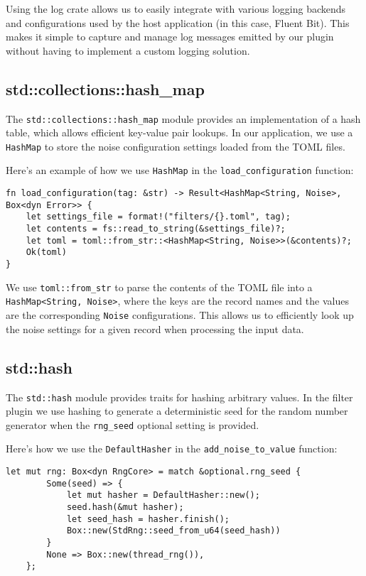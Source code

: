 Using the log crate allows us to easily integrate with various logging backends and configurations used by the host application (in this case, Fluent Bit). This makes it simple to capture and manage log messages emitted by our plugin without having to implement a custom logging solution.

\subsection{std::collections::hash\_map}
The \texttt{std::collections::hash_map} module provides an implementation of a hash table, which allows efficient key-value pair lookups. In our application, we use a \texttt{HashMap} to store the noise configuration settings loaded from the TOML files.

Here's an example of how we use \texttt{HashMap} in the \texttt{load_configuration} function:

\begin{verbatim}
fn load_configuration(tag: &str) -> Result<HashMap<String, Noise>, Box<dyn Error>> {
    let settings_file = format!("filters/{}.toml", tag);
    let contents = fs::read_to_string(&settings_file)?;
    let toml = toml::from_str::<HashMap<String, Noise>>(&contents)?;
    Ok(toml)
}
\end{verbatim}

We use \texttt{toml::from_str} to parse the contents of the TOML file into a \texttt{HashMap<String, Noise>}, where the keys are the record names and the values are the corresponding \texttt{Noise} configurations. This allows us to efficiently look up the noise settings for a given record when processing the input data.

\subsection{std::hash}
The \texttt{std::hash} module provides traits for hashing arbitrary values. In the filter plugin we use hashing to generate a deterministic seed for the random number generator when the \texttt{rng_seed} optional setting is provided.

Here's how we use the \texttt{DefaultHasher} in the \texttt{add_noise_to_value} function:

\begin{verbatim}
let mut rng: Box<dyn RngCore> = match &optional.rng_seed {
        Some(seed) => {
            let mut hasher = DefaultHasher::new();
            seed.hash(&mut hasher);
            let seed_hash = hasher.finish();
            Box::new(StdRng::seed_from_u64(seed_hash))
        }
        None => Box::new(thread_rng()),
    };
\end{verbatim}

